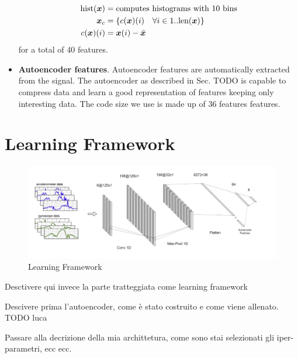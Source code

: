 \begin{itemize}
\begin{align}
    \text{hist}(\boldsymbol{x}) &= \text{computes histograms with $10$ bins} \\
    \boldsymbol{x}_c &= \{ c(\boldsymbol{x})(i) \quad \forall i \in 1..\text{len}(\boldsymbol{x}) \} \\
    c(\boldsymbol{x})(i) &= \boldsymbol{x}(i) - \bar{\boldsymbol{x}}
  \end{align}
  for a total of 40 features.
\item \textbf{Autoencoder features}. Autoencoder features are
  automatically extracted from the signal. The autoencoder as
  described in Sec. TODO is capable to compress data and learn a good
  representation of features keeping only interesting data. The code
  size we use is made up of 36 features features.
\end{itemize}

\section{Learning Framework}
\label{sec:learning_framework}

\begin{figure}[h]
	\centering
	\includegraphics[width=1\textwidth]{images/full_architecture.jpg}
	\caption{Learning Framework}
\end{figure}

Desctivere qui invece la parte tratteggiata come learning framework

Descivere prima l'autoencoder, come è stato costruito e come viene allenato. TODO luca

Passare alla decrizione della mia archittetura, come sono stai selezionati gli iper-parametri, ecc ecc.
